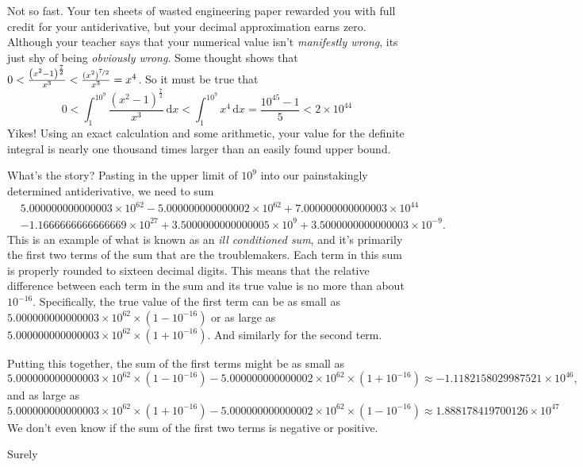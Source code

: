 \documentclass[12pt,fleqn]{article}
\newcounter{ex}\setcounter{ex}{0}
\begin{document}
Not so fast. Your ten sheets of wasted engineering paper rewarded
you with full credit for your antiderivative, but your
decimal approximation earns zero. Although your teacher says that 
your numerical value isn't \emph{manifestly wrong}, its 
just shy of being \emph{obviously wrong}. Some thought 
shows that $0 < \frac{{{\left( {{x}^{2}}-1\right) }^{\frac{7}{2}}}}{{{x}^{3}}}
< \frac{(x^2)^{\nicefrac{7}{2}}} {x^3} = x^4$. So it must be true that
\begin{equation*}
   0 <  \int_1^{10^9} {\left. \frac{{{\left( {{x}^{2}}-1\right) }^{\frac{7}{2}}}}{{{x}^{3}}} \, \mathrm{d}x\right.}
       < \int_1^{10^9} x^4 \, \mathrm{d}x =  \frac{10^{45} - 1 }{5} < 2  \times 10^{44}
\end{equation*}
Yikes! Using an exact calculation and some arithmetic, your value 
for the definite integral is nearly one thousand times larger than
an easily found upper bound.

What's the story?  Pasting in the upper limit of $10^9$ into our 
painstakingly determined antiderivative, we need to sum
\begin{align*}
&5.000000000000003 \times  {{10}^{62}} - 5.000000000000002  \times 
{{10}^{62}} + 7.000000000000003 \times {{10}^{44}}  \\
&-1.1666666666666669 \times {{10}^{27}} + 
3.5000000000000005 \times {{10}^{9}} + 3.5000000000000003 \times {{10}^{-9}}.
\end{align*}
This is an example of what is known as an \emph{ill conditioned sum}, and 
it's primarily  the first two terms of the sum that are the 
troublemakers. Each term in this sum is properly rounded to sixteen 
decimal digits. This means that the relative difference between 
each term in the sum and its true value is no more than about 
$10^{-16}$. Specifically, the true value of the first term 
can be as small as $5.000000000000003 \times  {{10}^{62}} \times
(1 - 10^{-16})$ or as large as $5.000000000000003 \times  {{10}^{62}} 
\times (1 + 10^{-16})$. And similarly for the second term.

Putting this together, the sum of the first terms might be as small
as 
\begin{equation*}
  5.000000000000003 \times 10^{62} \times (1 -  10^{-16}) - 5
   .000000000000002 \times 10^{62} \times  (1  + 10^{-16})
   \approx -1.1182158029987521 \times 10^{46},
\end{equation*}
and as large as 
\begin{equation*}
  5.000000000000003 \times 10^{62} \times (1 + 10^{-16}) - 5
   .000000000000002 \times 10^{62} \times  (1  - 10^{-16})
   \approx 1.888178419700126 \times {{10}^{47}}
\end{equation*}
We don't even know if the sum of the first two terms is negative or 
positive.

Surely
\end{document}
